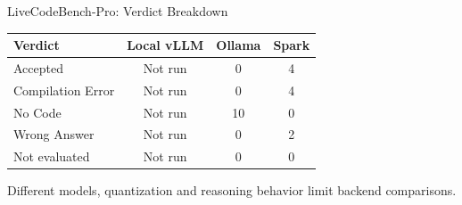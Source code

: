 \begin{frame}{LiveCodeBench-Pro: Verdict Breakdown}
\small
\begin{tabular}{lccc}\toprule
Verdict & Local vLLM & Ollama & Spark \\\midrule
Accepted & Not run & 0 & 4 \\
Compilation Error & Not run & 0 & 4 \\
No Code & Not run & 10 & 0 \\
Wrong Answer & Not run & 0 & 2 \\
Not evaluated & Not run & 0 & 0 \\
\bottomrule\end{tabular}
\vfill\footnotesize Different models, quantization and reasoning behavior limit backend comparisons.
\end{frame}
